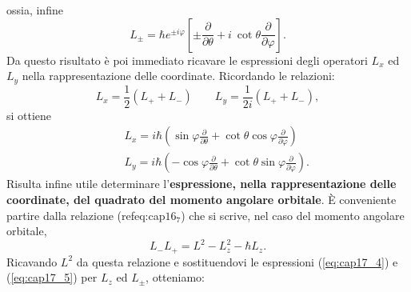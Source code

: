 ossia, infine
\begin{equation}
L_{\pm}=\hbar e^{\pm i \varphi}\left[\pm \frac{\partial}{\partial \theta}+ i\ \cot \theta\frac{\partial}{\partial \varphi}\right] .
\label{eq:cap17_5}
\end{equation}
Da questo risultato è poi immediato ricavare le espressioni degli operatori $L_x$ ed $L_y$ nella rappresentazione delle coordinate. Ricordando le relazioni:
\begin{equation}
L_x = \frac{1}{2} (L_+ + L_-) \qquad L_y = \frac{1}{2i} (L_+ + L_-),
\end{equation}
si ottiene
\begin{eqnarray}
& &L_x =i\hbar \left( \sin \varphi \frac{\partial}{\partial \theta}+\cot \theta \cos \varphi \frac{\partial}{\partial \varphi}\right)\\
& &L_y =i\hbar \left(- \cos \varphi \frac{\partial}{\partial \theta}+\cot \theta \sin \varphi \frac{\partial}{\partial \varphi}\right) .
\end{eqnarray}
Risulta infine utile determinare l'\textbf{espressione, nella rappresentazione delle coordinate, del quadrato del momento angolare orbitale}. È conveniente partire dalla relazione (refeq:cap$16_7$) che si scrive, nel caso del momento angolare orbitale,
\begin{equation}
L_- L_+ = L^2 -L_z ^2 -\hbar L_z .
\end{equation}
Ricavando $L^2$ da questa relazione e sostituendovi le espressioni (\ref{eq:cap17_4}) e (\ref{eq:cap17_5}) per $L_z$ ed $L_{\pm}$, otteniamo:

